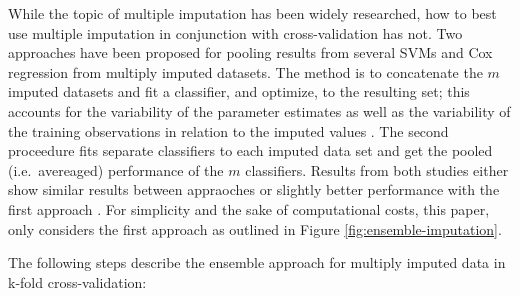 \documentclass[12pt,]{article}
\begin{document}
While the topic of multiple imputation has been widely researched, how
to best use multiple imputation in conjunction with cross-validation has
not. Two approaches have been proposed for pooling results from several
SVMs \autocite{belanche_handling_2014} and Cox regression
\autocite{zavrakidis_combining_2017} from multiply imputed datasets. The
method is to concatenate the \(m\) imputed datasets and fit a
classifier, and optimize, to the resulting set; this accounts for the
variability of the parameter estimates as well as the variability of the
training observations in relation to the imputed values
\autocite{belanche_handling_2014}. The second proceedure fits separate
classifiers to each imputed data set and get the pooled (i.e.~avereaged)
performance of the \(m\) classifiers. Results from both studies either
show similar results between appraoches
\autocite{zavrakidis_combining_2017} or slightly better performance with
the first approach \autocite{belanche_handling_2014}. For simplicity and
the sake of computational costs, this paper, only considers the first
approach as outlined in Figure \ref{fig:ensemble-imputation}.

The following steps describe the ensemble approach for multiply imputed
data in k-fold cross-validation:
\end{document}
